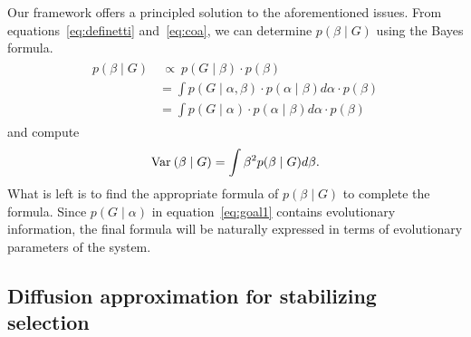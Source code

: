 \documentclass[10pt]{article}
\begin{document}
Our framework offers a principled solution to the aforementioned issues.
From equations~\ref{eq:definetti} and~\ref{eq:coa}, we can determine $p(\beta \mid G)$ using the Bayes formula.
\begin{align} \label{eq:goal1}
    \begin{aligned}
    p(\beta \mid G) & \ \propto \
    p(G \mid \beta) \cdot p(\beta) \\
    &= \int p(G \mid \alpha, \beta) \cdot p(\alpha \mid \beta) d\alpha \cdot p(\beta) \\
    &= \int p(G \mid \alpha) \cdot p(\alpha \mid \beta) d\alpha \cdot p(\beta)
    \end{aligned}
\end{align}
and compute
\begin{align} \label{eq:goal2}
    \mathrm{Var}_{}\left(\beta \mid G\right) = \int \beta^2 p(\beta \mid G) d\beta.
\end{align}
What is left is to find the appropriate formula of $p(\beta \mid G)$ to complete the formula.
Since $p(G\mid\alpha)$ in equation~\ref{eq:goal1} contains evolutionary information,
the final formula will be naturally expressed in terms of evolutionary parameters of the system.

\subsection{Diffusion approximation for stabilizing selection}
\end{document}
